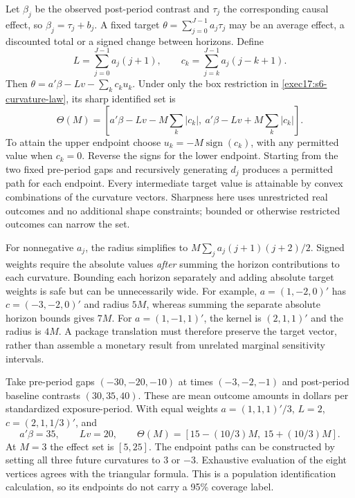 Let $\beta_j$ be the observed post-period contrast and $\tau_j$ the
corresponding causal effect, so $\beta_j=\tau_j+b_j$. A fixed target
$\theta=\sum_{j=0}^{J-1}a_j\tau_j$ may be an average effect, a discounted
total or a signed change between horizons. Define
\begin{equation}
 L=\sum_{j=0}^{J-1}a_j(j+1),\qquad
 c_k=\sum_{j=k}^{J-1}a_j(j-k+1).
 \label{exec17:s6-target-kernel}
\end{equation}
Then $\theta=a'\beta-Lv-\sum_k c_ku_k$. Under only the box
restriction in \eqref{exec17:s6-curvature-law}, its sharp identified set is
\begin{equation}
 \Theta(M)=
 \left[a'\beta-Lv-M\sum_k|c_k|,
       \ a'\beta-Lv+M\sum_k|c_k|\right].
 \label{exec17:s6-sharp-curvature}
\end{equation}
To attain the upper endpoint choose
$u_k=-M\operatorname{sign}(c_k)$, with any permitted value when
$c_k=0$. Reverse the signs for the lower endpoint. Starting from the
two fixed pre-period gaps and recursively generating $d_j$ produces a
permitted path for each endpoint. Every intermediate target value is
attainable by convex combinations of the curvature vectors. Sharpness here
uses unrestricted real outcomes and no additional shape constraints; bounded
or otherwise restricted outcomes can narrow the set.

For nonnegative $a_j$, the radius simplifies to
$M\sum_j a_j(j+1)(j+2)/2$. Signed weights require the absolute values
\emph{after} summing the horizon contributions to each curvature. Bounding
each horizon separately and adding absolute target weights is safe but can
be unnecessarily wide. For example, $a=(1,-2,0)'$ has
$c=(-3,-2,0)'$ and radius $5M$, whereas summing the separate absolute
horizon bounds gives $7M$. For $a=(1,-1,1)'$, the kernel is
$(2,1,1)'$ and the radius is $4M$. A package translation must therefore
preserve the target vector, rather than assemble a monetary result from
unrelated marginal sensitivity intervals.

Take pre-period gaps $(-30,-20,-10)$ at times $(-3,-2,-1)$ and
post-period baseline contrasts $(30,35,40)$. These are mean outcome
amounts in dollars per standardized exposure-period. With equal weights
$a=(1,1,1)'/3$, $L=2$, $c=(2,1,1/3)'$, and
\begin{equation}
 a'\beta=35,\qquad Lv=20,\qquad
 \Theta(M)=[15-(10/3)M,\ 15+(10/3)M].
 \label{exec17:s6-money-sensitivity}
\end{equation}
At $M=3$ the effect set is $[5,25]$. The endpoint paths can be
constructed by setting all three future curvatures to $3$ or $-3$.
Exhaustive evaluation of the eight vertices agrees with the triangular
formula. This is a population identification calculation, so its endpoints
do not carry a 95\% coverage label.~\citep{exec17_s6_math}

